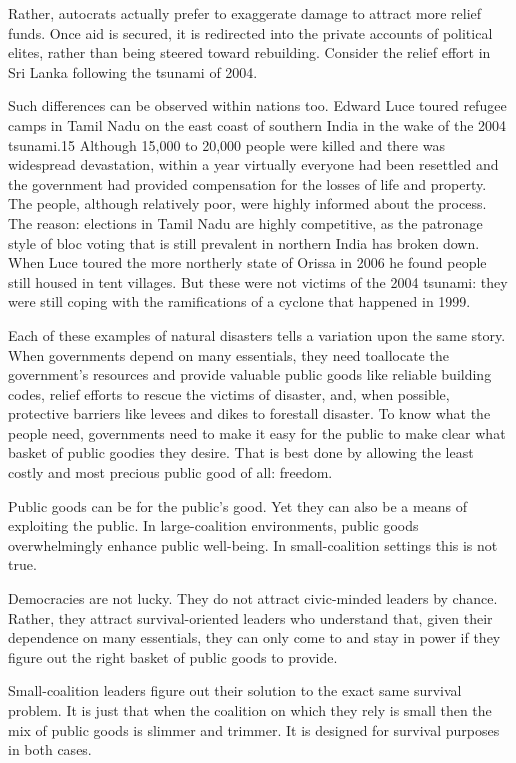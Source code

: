 \documentclass[10pt]{article}
\begin{document}
{\large Rather, autocrats actually prefer to exaggerate damage to attract more
relief funds. Once aid is secured, it is redirected into the private accounts of
political elites, rather than being steered toward rebuilding. Consider the
relief effort in Sri Lanka following the tsunami of 2004.}

{\large Such differences can be observed within nations too. Edward Luce toured
refugee camps in Tamil Nadu on the east coast of southern India in the wake of
the 2004 tsunami.15 Although 15,000 to 20,000 people were killed and there was
widespread devastation, within a year virtually everyone had been resettled and
the government had provided compensation for the losses of life and property. The
people, although relatively poor, were highly informed about the process. The
reason: elections in Tamil Nadu are highly competitive, as the patronage style of
bloc voting that is still prevalent in northern India has broken down. When Luce
toured the more northerly state of Orissa in 2006 he found people still housed in
tent villages. But these were not victims of the 2004 tsunami: they were still
coping with the ramifications of a cyclone that happened in 1999.}

{\large Each of these examples of natural disasters tells a variation upon the
same story. When governments depend on many essentials, they need toallocate the
government's resources and provide valuable public goods like reliable building
codes, relief efforts to rescue the victims of disaster, and, when possible,
protective barriers like levees and dikes to forestall disaster. To know what the
people need, governments need to make it easy for the public to make clear what
basket of public goodies they desire. That is best done by allowing the least
costly and most precious public good of all: freedom.}

{\large Public goods can be for the public's good. Yet they can also be a means
of exploiting the public. In large-coalition environments, public goods
overwhelmingly enhance public well-being. In small-coalition settings this is not
true.}

{\large Democracies are not lucky. They do not attract civic-minded leaders by
chance. Rather, they attract survival-oriented leaders who understand that, given
their dependence on many essentials, they can only come to and stay in power if
they figure out the right basket of public goods to provide.}

{\large Small-coalition leaders figure out their solution to the exact same
survival problem. It is just that when the coalition on which they rely is small
then the mix of public goods is slimmer and trimmer. It is designed for survival
purposes in both cases.}
\end{document}
